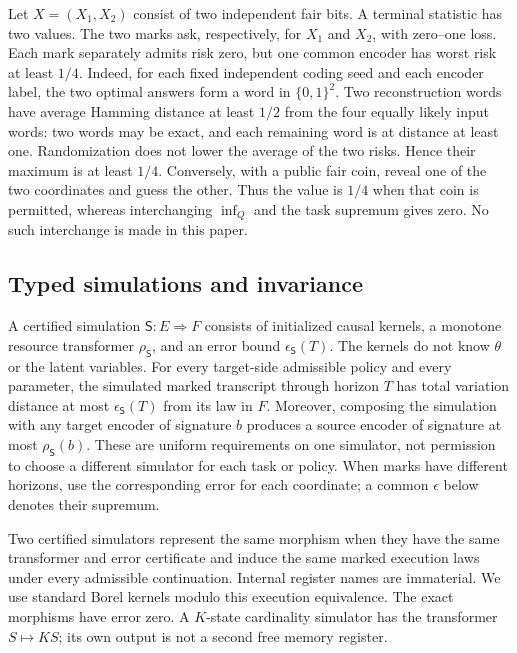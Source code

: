 \begin{example}\label{ex:v8-quantifiers}
Let $X=(X_1,X_2)$ consist of two independent fair bits. A terminal
statistic has two values. The two marks ask, respectively, for $X_1$ and
$X_2$, with zero--one loss. Each mark separately admits risk zero, but
one common encoder has worst risk at least $1/4$. Indeed, for each fixed
independent coding seed and each encoder label, the two optimal answers
form a word in $\{0,1\}^2$. Two reconstruction words have average Hamming
distance at least $1/2$ from the four equally likely input words: two
words may be exact, and each remaining word is at distance at least one.
Randomization does not lower the average of the two risks. Hence their
maximum is at least $1/4$. Conversely, with a public fair coin, reveal
one of the two coordinates and guess the other. Thus the value is $1/4$
when that coin is permitted, whereas interchanging $\inf_Q$ and the task
supremum gives zero. No such interchange is made in this paper.
\end{example}

\subsection{Typed simulations and invariance}
A certified simulation $\mathsf S:E\Rightarrow F$ consists of initialized
causal kernels, a monotone resource transformer $\rho_{\mathsf S}$, and
an error bound $\epsilon_{\mathsf S}(T)$. The kernels do not know $\theta$
or the latent variables. For every target-side admissible policy and
every parameter, the simulated marked transcript through horizon $T$
has total variation distance at most $\epsilon_{\mathsf S}(T)$ from its
law in $F$. Moreover, composing the simulation with any target encoder
of signature $b$ produces a source encoder of signature at most
$\rho_{\mathsf S}(b)$. These are uniform requirements on one simulator,
not permission to choose a different simulator for each task or policy.
When marks have different horizons, use the corresponding error for each
coordinate; a common $\epsilon$ below denotes their supremum.

Two certified simulators represent the same morphism when they have the
same transformer and error certificate and induce the same marked
execution laws under every admissible continuation. Internal register
names are immaterial. We use standard Borel kernels modulo this
execution equivalence. The exact morphisms have error zero. A
$K$-state cardinality simulator has the transformer $S\mapsto KS$;
its own output is not a second free memory register.

